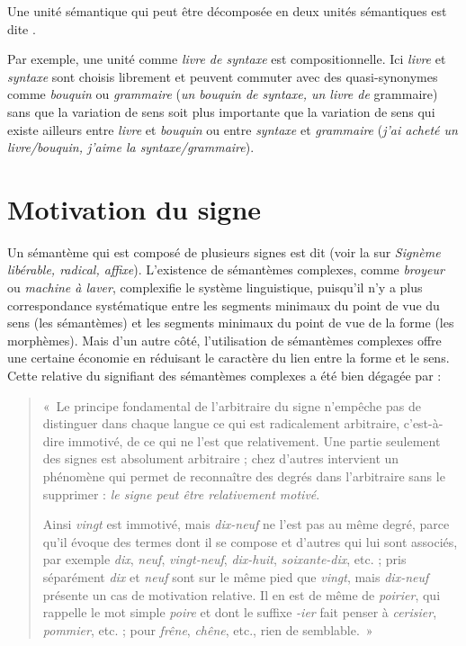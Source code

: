 {Une unité sémantique qui peut être décomposée en deux unités sémantiques est dite .}

Par exemple, une unité comme \textit{livre de syntaxe} est compositionnelle. Ici \textit{livre} et \textit{syntaxe} sont choisis librement et peuvent commuter avec des quasi-synonymes comme \textit{bouquin} ou \textit{grammaire} (\textit{un bouquin de syntaxe, un livre de} grammaire) sans que la variation de sens soit plus importante que la variation de sens qui existe ailleurs entre \textit{livre} et \textit{bouquin} ou entre \textit{syntaxe} et \textit{grammaire} (\textit{j’ai acheté un livre/bouquin, j’aime la syntaxe/grammaire}).

\section{Motivation du signe}\label{sec:2.3.2}

Un sémantème qui est composé de plusieurs signes est dit  (voir la  sur \textit{Signème libérable, radical, affixe}). L’existence de sémantèmes complexes, comme \textit{broyeur} ou \textit{machine à laver}, complexifie le système linguistique, puisqu’il n’y a plus correspondance systématique entre les segments minimaux du point de vue du sens (les sémantèmes) et les segments minimaux du point de vue de la forme (les morphèmes). Mais d’un autre côté, l’utilisation de sémantèmes complexes offre une certaine économie en réduisant le caractère  du lien entre la forme et le sens. Cette relative  du signifiant des sémantèmes complexes a été bien dégagée par \citet[180]{saussure1916cours} :

\begin{quote}
    «~Le principe fondamental de l’arbitraire du signe n’empêche pas de distinguer dans chaque langue ce qui est radicalement arbitraire, c’est-à-dire immotivé, de ce qui ne l’est que relativement. Une partie seulement des signes est absolument arbitraire ; chez d’autres intervient un phénomène qui permet de reconnaître des degrés dans l’arbitraire sans le supprimer : \textit{le signe peut être relativement motivé}.

Ainsi \textit{vingt} est immotivé, mais \textit{dix-neuf} ne l’est pas au même degré, parce qu’il évoque des termes dont il se compose et d’autres qui lui sont associés, par exemple \textit{dix}, \textit{neuf}, \textit{vingt-neuf}, \textit{dix-huit}, \textit{soixante-dix}, etc. ; pris séparément \textit{dix} et \textit{neuf} sont sur le même pied que \textit{vingt}, mais \textit{dix-neuf} présente un cas de motivation relative. Il en est de même de \textit{poirier}, qui rappelle le mot simple \textit{poire} et dont le suffixe \textit{{}-ier} fait penser à \textit{cerisier}, \textit{pommier}, etc. ; pour \textit{frêne}, \textit{chêne}, etc., rien de semblable.~»
\end{quote}


